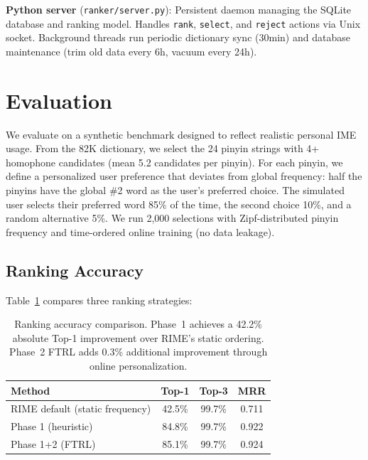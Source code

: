 \documentclass[11pt]{article}
\begin{document}
\textbf{Python server} (\texttt{ranker/server.py}): Persistent daemon managing
the SQLite database and ranking model. Handles \texttt{rank}, \texttt{select},
and \texttt{reject} actions via Unix socket. Background threads run periodic
dictionary sync (30min) and database maintenance (trim old data every 6h,
vacuum every 24h).

\section{Evaluation}

We evaluate on a synthetic benchmark designed to reflect realistic personal
IME usage. From the 82K dictionary, we select the 24 pinyin strings with 4+
homophone candidates (mean 5.2 candidates per pinyin). For each pinyin, we
define a personalized user preference that deviates from global frequency:
half the pinyins have the global \#2 word as the user's preferred choice. The
simulated user selects their preferred word 85\% of the time, the second
choice 10\%, and a random alternative 5\%. We run 2,000 selections with
Zipf-distributed pinyin frequency and time-ordered online training (no data
leakage).

\subsection{Ranking Accuracy}

Table~\ref{tab:accuracy} compares three ranking strategies:

\begin{table}[h]
\centering
\begin{tabular}{lccc}
\toprule
\textbf{Method} & \textbf{Top-1} & \textbf{Top-3} & \textbf{MRR} \\
\midrule
RIME default (static frequency) & 42.5\% & 99.7\% & 0.711 \\
Phase 1 (heuristic)             & 84.8\% & 99.7\% & 0.922 \\
Phase 1+2 (FTRL)                & 85.1\% & 99.7\% & 0.924 \\
\bottomrule
\end{tabular}
\caption{Ranking accuracy comparison. Phase~1 achieves a 42.2\% absolute
  Top-1 improvement over RIME's static ordering. Phase~2 FTRL adds 0.3\%
  additional improvement through online personalization.}
\label{tab:accuracy}
\end{table}
\end{document}
